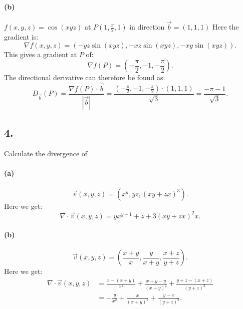 \paragraph{(b)} $f(x,y,z)= \cos \left( xyz \right) $ at $P(1, \frac{\pi}{2}, 1)$ in direction $\Vec{b} = \left( 1,1,1 \right) $
\bigbreak
Here the gradient is:
\[ 
\nabla f \left( x,y,z \right) = \left( - yz \sin \left( xyz \right), - xz \sin \left( xyz \right) , - xy \sin \left( xyz \right)  \right) 
.\]
This gives a gradient at $P$ of:
\[ 
\nabla f(P) = \left( - \frac{\pi}{2}, -1, - \frac{\pi}{2} \right) 
.\]
The directional derivative can therefore be found as:
\[ 
D_{\Vec{b}}(P) = \frac{\nabla f (P) \cdot \Vec{b}}{\left| \Vec{b} \right|} = \frac{ \left(- \frac{\pi}{2}, -1, - \frac{\pi}{2} \right) \cdot \left( 1,1,1 \right) }{\sqrt{3}} = \frac{-\pi - 1}{\sqrt{3}}
.\]



\subsection*{4.} Calculate the divergence of

\paragraph{(a)}
\[ 
\Vec{v} \left( x,y,z \right) = \left( x^{y}, yz, \left( xy + zx \right)^3 \right) 
.\]
\bigbreak
Here we get:
\[ 
\nabla \cdot  \Vec{v} \left( x,y,z \right) = y x^{y-1} + z + 3 \left( xy + zx \right)^2 x
.\]


\paragraph{(b)}
\[ 
\Vec{v}\left( x,y,z \right) = \left( \frac{x+y}{x}, \frac{y}{x+y}, \frac{x+z}{y+z} \right)
.\]
\bigbreak
Here we get:
\begin{align*}
\nabla \cdot \Vec{v}\left( x,y,z \right) &= \frac{x- (x+y)}{x^2} + \frac{x+y-y}{\left( x+y \right)^2} + \frac{y+z - \left( x+z \right) }{\left( y+z \right)^2} \\
&= - \frac{y}{x^2} + \frac{x}{\left( x+y \right)^2} + \frac{y-x}{\left( y+z \right)^2}
.\end{align*}

